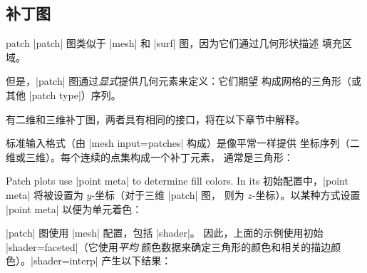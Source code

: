 {\subsection{补丁图}
\label{sec:pgfplots:3d:patch}

\begin{plottype}[/pgfplots]{patch}
        |patch| 图类似于 |mesh| 和 |surf| 图，因为它们通过几何形状描述
        填充区域。

    但是，|patch| 图通过\emph{显式}提供几何元素来定义：它们期望
    构成网格的三角形（或其他 |patch type|）序列。

    有二维和三维补丁图，两者具有相同的接口，将在以下章节中解释。

    标准输入格式（由 |mesh input=patches| 构成）是像平常一样提供
    坐标序列（二维或三维）。每个连续的点集构成一个补丁元素，
    通常是三角形：
\begin{codeexample}[]
\end{codeexample}
    \noindent Patch plots use |point meta| to determine fill colors. In its
        初始配置中，|point meta| 将被设置为 $y$-坐标（对于三维 |patch| 图，
        则为 $z$-坐标）。以某种方式设置 |point meta|
        以便为单元着色：
\begin{codeexample}[]
\end{codeexample}
    |patch| 图使用 |mesh| 配置，包括 |shader|。
    因此，上面的示例使用初始 |shader=faceted|（它使用\emph{平均}
    颜色数据来确定三角形的颜色和相关的描边颜色）。|shader=interp|
    产生以下结果：
\begin{codeexample}[]
\end{codeexample}
\end{plottype}}
